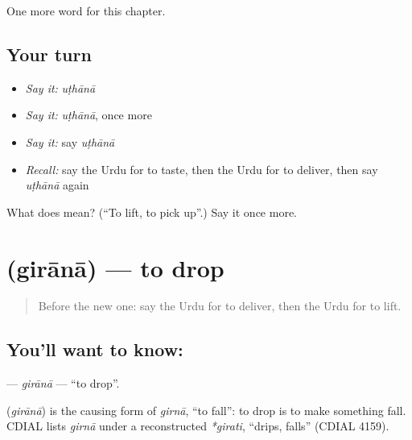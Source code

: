 \begin{grammarlens}[title={What you've built}]
One more word for this chapter.
\end{grammarlens}

\subsection*{Your turn}
\begin{itemize}
\raggedright
  \item \emph{Say it:} \emph{uṭhānā}
  \item \emph{Say it:} \emph{uṭhānā}, once more
  \item \emph{Say it:} say \emph{uṭhānā}
  \item \emph{Recall:} say the Urdu for to taste, then the Urdu for to deliver, then say \emph{uṭhānā} again
\end{itemize}

\begin{tcolorbox}[breakable,colback=teal!4,colframe=teal!35!black,title={Before you move on}]
What does  mean? (\textquotedblleft{}To lift, to pick up\textquotedblright{}.) Say it once more.
\end{tcolorbox}
\section[\texorpdfstring{\ur{گرانا} (girānā)}{گرانا (girānā)}]{ (girānā) — to drop}

\label{lesson:UR-C213-girana}



\begin{quote}
Before the new one: say the Urdu for to deliver, then the Urdu for to lift.
\end{quote}

\subsection*{You'll want to know: }
\textbf{} — \emph{girānā} — \textquotedblleft{}to drop\textquotedblright{}.

\begin{cousinweb}
\textbf{} (\emph{girānā}) is the causing form of \emph{girnā}, \textquotedblleft{}to fall\textquotedblright{}: to drop is to make something fall. CDIAL lists \emph{girnā} under a reconstructed \emph{*girati}, \textquotedblleft{}drips, falls\textquotedblright{} (CDIAL 4159).
\end{cousinweb}

